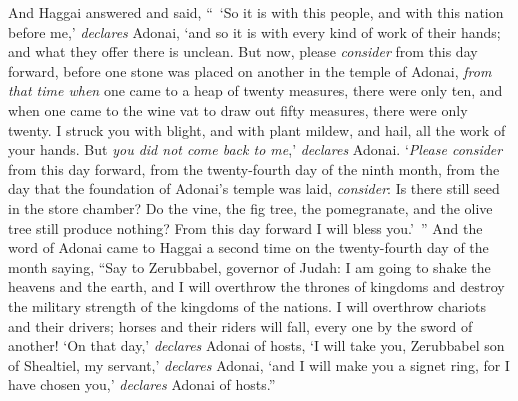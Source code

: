 \begin{biblechapter}
\verse And Haggai answered and said, “ ‘So it is with this people, and with this nation before me,’ \textit{declares} Adonai, ‘and so it is with every kind of work of their hands; and what they offer there is unclean.
\verse But now, please \textit{consider} from this day forward, before one stone was placed on another in the temple of Adonai,
\verse \textit{from that time when} one came to a heap of twenty measures, there were only ten, and when one came to the wine vat to draw out fifty measures, there were only twenty.
\verse I struck you with blight, and with plant mildew, and hail, all the work of your hands. But \textit{you did not come back to me},’ \textit{declares} Adonai.
\verse ‘\textit{Please consider} from this day forward, from the twenty-fourth day of the ninth month, from the day that the foundation of Adonai’s temple was laid, \textit{consider}:
\verse Is there still seed in the store chamber? Do the vine, the fig tree, the pomegranate, and the olive tree still produce nothing? From this day forward I will bless you.’ ”
 And the word of Adonai came to Haggai a second time on the twenty-fourth day of the month saying,
\verse “Say to Zerubbabel, governor of Judah: I am going to shake the heavens and the earth,
\verse and I will overthrow the thrones of kingdoms and destroy the military strength of the kingdoms of the nations. I will overthrow chariots and their drivers; horses and their riders will fall, every one by the sword of another!
\verse ‘On that day,’ \textit{declares} Adonai of hosts, ‘I will take you, Zerubbabel son of Shealtiel, my servant,’ \textit{declares} Adonai, ‘and I will make you a signet ring, for I have chosen you,’ \textit{declares} Adonai of hosts.”
\end{biblechapter}

